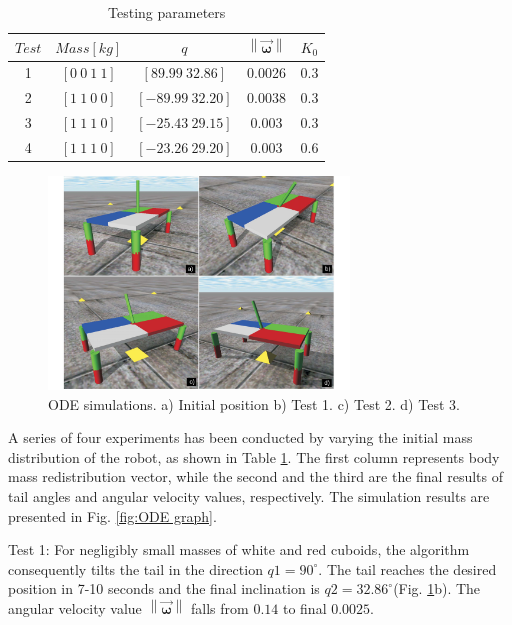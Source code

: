 \begin{table}[!t]
	\centering
\begin{tabular}{|c|c|c|c|c|}
	\hline
$Test$ &  $Mass[kg]$ & $q$  & $\left \| \vec{\boldsymbol{\omega}} \right \|$ & $K_0$\\
	\hline
1   & $[0\: 0\: 1\: 1]$ & $[89.99\: 32.86]$ & 0.0026 & 0.3\\
2   & $[1\: 1\: 0\: 0]$ & $[-89.99\: 32.20]$ & 0.0038 & 0.3\\
3   & $[1\: 1\: 1\: 0]$ & $[-25.43\: 29.15]$ &  0.003 & 0.3\\
4   & $[1\: 1\: 1\: 0]$ & $[-23.26\: 29.20]$ &  0.003 & 0.6\\
\hline
\end{tabular}
\caption{Testing parameters}\label{tab:Simulations}
\end{table}



\begin{figure}[!t]
	\centering
	\includegraphics[width=80mm]{./pictures/ODE_simulations.pdf}
	\caption{ODE simulations. a) Initial position b) Test 1. c) Test 2. d) Test 3.}
	\label{fig:ODESimulations}
\end{figure}

A series of four experiments has been conducted by varying the initial mass distribution of the robot, as shown in Table \ref{tab:Simulations}. The first column represents body mass redistribution vector, while the second and the third are the final results of tail angles and angular velocity values, respectively. The simulation results are presented in Fig. \ref{fig:ODE graph}. 

Test 1: For negligibly small masses of white and red cuboids, the algorithm consequently tilts the tail in the direction $q1=90^{\circ}$. The tail reaches the desired position in 7-10 seconds and the final inclination is $q2=32.86^{\circ}$(Fig. \ref{fig:ODESimulations}b). The angular velocity value $\left \| \vec{\boldsymbol{\omega}} \right \|$ falls from $0.14$ to final $0.0025$.


